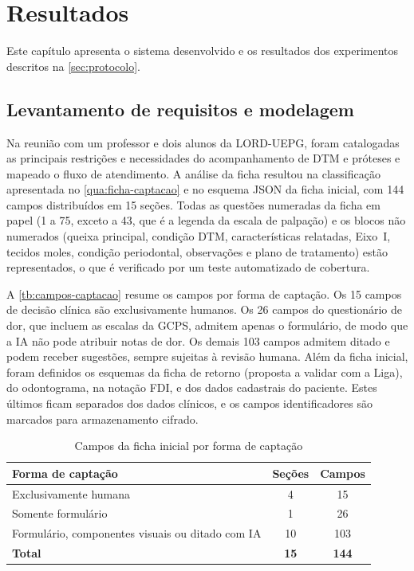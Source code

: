 \chapter{Resultados}
\label{cap:resultados}

Este capítulo apresenta o sistema desenvolvido e os resultados dos experimentos descritos na \autoref{sec:protocolo}.

\section{Levantamento de requisitos e modelagem}

Na reunião com um professor e dois alunos da LORD-UEPG, foram catalogadas as principais restrições e necessidades do acompanhamento de DTM e próteses e mapeado o fluxo de atendimento. A análise da ficha resultou na classificação apresentada no \autoref{qua:ficha-captacao} e no esquema JSON da ficha inicial, com 144 campos distribuídos em 15 seções. Todas as questões numeradas da ficha em papel (1 a 75, exceto a 43, que é a legenda da escala de palpação) e os blocos não numerados (queixa principal, condição DTM, características relatadas, Eixo~I, tecidos moles, condição periodontal, observações e plano de tratamento) estão representados, o que é verificado por um teste automatizado de cobertura.

A \autoref{tb:campos-captacao} resume os campos por forma de captação. Os 15 campos de decisão clínica são exclusivamente humanos. Os 26 campos do questionário de dor, que incluem as escalas da GCPS, admitem apenas o formulário, de modo que a IA não pode atribuir notas de dor. Os demais 103 campos admitem ditado e podem receber sugestões, sempre sujeitas à revisão humana. Além da ficha inicial, foram definidos os esquemas da ficha de retorno (proposta a validar com a Liga), do odontograma, na notação FDI, e dos dados cadastrais do paciente. Estes últimos ficam separados dos dados clínicos, e os campos identificadores são marcados para armazenamento cifrado.

\begin{table}[htbp]
	\caption{Campos da ficha inicial por forma de captação}
	\label{tb:campos-captacao}
	\footnotesize
	\centering
	\begin{tabular}{lcc}
		\hline
		\textbf{Forma de captação} & \textbf{Seções} & \textbf{Campos} \\ \hline
		Exclusivamente humana & 4 & 15 \\
		Somente formulário & 1 & 26 \\
		Formulário, componentes visuais ou ditado com IA & 10 & 103 \\
		\textbf{Total} & \textbf{15} & \textbf{144} \\ \hline
	\end{tabular}
\end{table}

